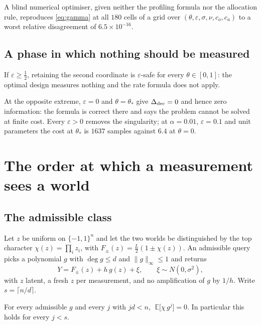 A blind numerical optimiser, given neither the profiling formula nor the allocation rule,
reproduces \eqref{eq:gamma} at all $180$ cells of a grid over
$(\theta,\varepsilon,\sigma,\nu,c_{o},c_{a})$ to a worst relative disagreement of
$6.5\times10^{-16}$. \NUM{}

\subsection{A phase in which nothing should be measured}

If $\varepsilon\ge\tfrac12$, retaining the second coordinate is $\varepsilon$-safe for
every $\theta\in[0,1]$: the optimal design measures nothing and the rate formula does not
apply.


At the opposite extreme, $\varepsilon=0$ and $\theta=\theta_{*}$ give
$\Delta_{\rm dec}=0$ and hence zero information: the formula is correct there and says the
problem cannot be solved at finite cost. Every $\varepsilon>0$ removes the singularity;
at $\alpha=0.01$, $\varepsilon=0.1$ and unit parameters the cost at $\theta_{*}$ is
$1637$ samples against $6.4$ at $\theta=0$.

\section{The order at which a measurement sees a world}
\label{sec:query}

\subsection{The admissible class}

Let $z$ be uniform on $\{-1,1\}^{n}$ and let the two worlds be distinguished by the top
character $\chi(z)=\prod_{i}z_{i}$, with $F_{\pm}(z)=\tfrac{L}{2}(1\pm\chi(z))$. An
admissible query picks a polynomial $g$ with $\deg g\le d$ and $\|g\|_{\infty}\le1$ and
returns
\begin{equation}
Y=F_{\pm}(z)+h\,g(z)+\xi,\qquad \xi\sim N(0,\sigma^{2}),
\label{eq:querymodel}
\end{equation}
with $z$ latent, a fresh $z$ per measurement, and no amplification of $g$ by $1/h$. Write
$s=\lceil n/d\rceil$.

\begin{theorem}
\label{thm:vanish}
For every admissible $g$ and every $j$ with $jd<n$,
$\;\mathbb{E}\bigl[\chi\,g^{j}\bigr]=0$. In particular this holds for every $j<s$.
\end{theorem}


